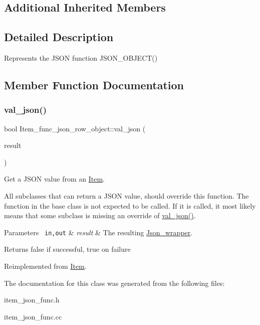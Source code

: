 \subsection*{Additional Inherited Members}


\subsection{Detailed Description}
Represents the J\+S\+ON function J\+S\+O\+N\+\_\+\+O\+B\+J\+E\+C\+T() 

\subsection{Member Function Documentation}
\mbox{\label{classItem__func__json__row__object_ac325e6707cbb0d96b06b8695ca05f228}} 
\subsubsection{\texorpdfstring{val\+\_\+json()}{val\_json()}}
{\footnotesize\ttfamily bool Item\+\_\+func\+\_\+json\+\_\+row\+\_\+object\+::val\+\_\+json (\begin{DoxyParamCaption}\item[{\mbox{\hyperlink{classJson__wrapper}{Json\+\_\+wrapper}} $\ast$}]{result }\end{DoxyParamCaption})\hspace{0.3cm}{\ttfamily [virtual]}}

Get a J\+S\+ON value from an \mbox{\hyperlink{classItem}{Item}}.

All subclasses that can return a J\+S\+ON value, should override this function. The function in the base class is not expected to be called. If it is called, it most likely means that some subclass is missing an override of \mbox{\hyperlink{classItem__func__json__row__object_ac325e6707cbb0d96b06b8695ca05f228}{val\+\_\+json()}}.


\begin{DoxyParams}[1]{Parameters}
\mbox{\texttt{ in,out}}  & {\em result} & The resulting \mbox{\hyperlink{classJson__wrapper}{Json\+\_\+wrapper}}.\\
\hline
\end{DoxyParams}
\begin{DoxyReturn}{Returns}
false if successful, true on failure 
\end{DoxyReturn}


Reimplemented from \mbox{\hyperlink{classItem_a57e763fcde2d0a819d21e31c59611290}{Item}}.



The documentation for this class was generated from the following files\+:\begin{DoxyCompactItemize}
\item 
item\+\_\+json\+\_\+func.\+h\item 
item\+\_\+json\+\_\+func.\+cc\end{DoxyCompactItemize}
